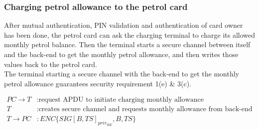 \subsubsection{Charging petrol allowance to the petrol card}
After mutual authentication, PIN validation and authentication of card owner
has been done, the petrol card can ask the charging terminal to charge its
allowed monthly petrol balance. Then the terminal starts a secure channel
between itself and the back-end to get the monthly petrol allowance, and then
writes those values back to the petrol card.\\

The terminal starting a secure channel with the back-end to get the monthly petrol allowance guarantees security requirement 1(e) \& 3(c).

\begin{equation}\nonumber
\begin{split}
PC \to T&: \text{request APDU to initiate charging monthly allowance} \\
T&: \text{creates secure channel and requests monthly allowance from back-end} \\
T \to PC&: ENC\{SIG[B,TS]_{priv_{BE}}, B, TS\}
\end{split} 
\end{equation}
